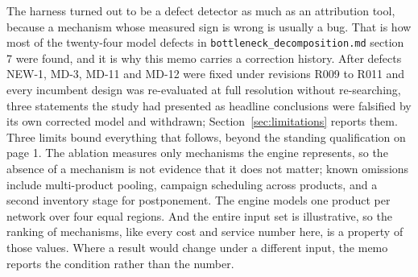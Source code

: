 The harness turned out to be a defect detector as much as an attribution tool, because a
mechanism whose measured sign is wrong is usually a bug. That is how most of the twenty-four
model defects in \texttt{bottleneck\_decomposition.md} section 7 were found, and it is why this
memo carries a correction history. After defects NEW-1, MD-3, MD-11 and MD-12 were fixed under
revisions R009 to R011 and every incumbent design was re-evaluated at full resolution without
re-searching, three statements the study had presented as headline conclusions were falsified by
its own corrected model and withdrawn; Section~\ref{sec:limitations} reports them. Three limits
bound everything that follows, beyond the standing qualification on page 1. The ablation
measures only mechanisms the engine represents, so the absence of a mechanism is not evidence
that it does not matter; known omissions include multi-product pooling, campaign scheduling
across products, and a second inventory stage for postponement. The engine models one product
per network over four equal regions. And the entire input set is illustrative, so the ranking of
mechanisms, like every cost and service number here, is a property of those values. Where a
result would change under a different input, the memo reports the condition rather than the
number.
